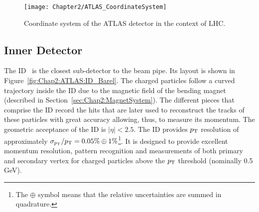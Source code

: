 \begin{figure}
	\centering
 	 \texttt{[image: Chapter2/ATLAS\_CoordinateSystem]}
	 \caption{Coordinate system of the ATLAS detector in the context of LHC.}
	\label{fig:Chap2:ATLAS:CoordinateSystem}
\end{figure}


\subsection{Inner Detector}
\label{sec:Chap2:ID}
The ID~\cite{CERN-LHCC-97-016, ATLAS:2010ylv, ATLAS:2008xda} is the closest sub-detector to the beam pipe.
Its layout is shown in Figure~\ref{fig:Chap2:ATLAS:ID_Barel}. %
The charged particles follow a curved trajectory inside the ID due to the magnetic field of the 
bending magnet (described in Section~\ref{sec:Chap2:MagnetSystem}). The different pieces that
comprise the ID record the hits that are later used  to reconstruct the tracks of these particles 
with great accuracy allowing, thus, to measure its momentum. 
The geometric acceptance of the ID is 
$|\eta| < 2.5$. %
The ID provides $p_{\text{T}}$ resolution %
of approximately $\sigma_{p_{\text{T}}} / p_{\text{T}} = 0.05\% \oplus 1\%$\footnote{The $\oplus$ symbol means that the 
relative uncertainties are summed in quadrature.}.
It is designed to provide excellent momentum resolution, pattern recognition and measurements of both primary and secondary vertex
for charged particles above the $p_{\text{T}}$ threshold (nominally 0.5 GeV).

